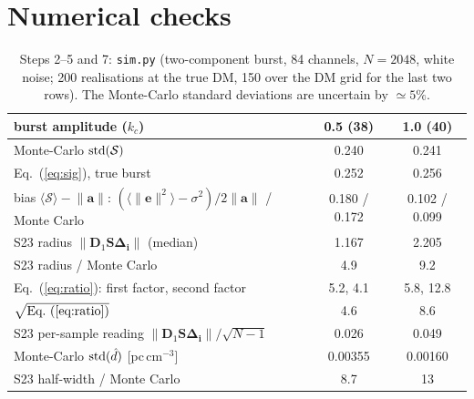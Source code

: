 \documentclass[11pt]{article}
\newcommand{\vb}[1]{\boldsymbol{#1}}
\newcommand{\Dn}{\vb D_1}
\newcommand{\Sm}{\vb S}
\newcommand{\Di}{\vb\Delta_{\vb i}}
\newcommand{\nrm}[1]{\lVert #1\rVert}
\newcommand{\na}{\nrm{\vb a}}
\newcommand{\Sc}{\mathcal S}
\begin{document}
\section*{Numerical checks}

\begin{table}[h]\centering\small
\caption{Steps 2--5 and 7: \texttt{sim.py} (two-component burst, 84 channels, $N=2048$, white noise;
200 realisations at the true DM, 150 over the DM grid for the last two rows). The Monte-Carlo standard deviations
are uncertain by $\simeq5\%$.}\label{tab:sim}
\vspace{4pt}
\begin{tabular}{lcc}
\toprule
burst amplitude ($k_c$) & 0.5 (38) & 1.0 (40)\\
\midrule
Monte-Carlo ${\rm std}(\Sc)$ & 0.240 & 0.241\\
Eq.~(\ref{eq:sig}), true burst & 0.252 & 0.256\\
bias $\langle\Sc\rangle-\na$: $(\langle\nrm{\vb e}^{2}\rangle-\sigma^{2})/2\na$ / Monte Carlo & 0.180 / 0.172 & 0.102 / 0.099\\
S23 radius $\nrm{\Dn\Sm\Di}$ (median) & 1.167 & 2.205\\
S23 radius / Monte Carlo & 4.9 & 9.2\\
Eq.~(\ref{eq:ratio}): first factor, second factor & 5.2, 4.1 & 5.8, 12.8\\
$\sqrt{\text{Eq.~(\ref{eq:ratio})}}$ & 4.6 & 8.6\\
S23 per-sample reading $\nrm{\Dn\Sm\Di}/\sqrt{N-1}$ & 0.026 & 0.049\\
\midrule
Monte-Carlo ${\rm std}(\hat d)$ [pc\,cm$^{-3}$] & 0.00355 & 0.00160\\
S23 half-width / Monte Carlo & 8.7 & 13\\
\bottomrule
\end{tabular}
\end{table}
\end{document}
